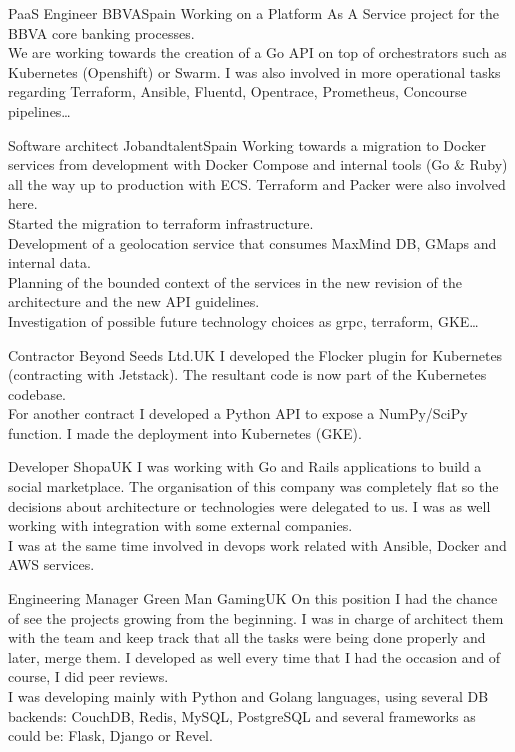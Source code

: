 \documentclass[11pt, a4paper, sans]{moderncv}
\begin{document}
\makecvtitle


%
%

{PaaS Engineer}
{BBVA}{Spain}{}
{Working on a Platform As A Service project for the BBVA core banking processes.\\
We are working towards the creation of a Go API on top of orchestrators such as Kubernetes (Openshift) or Swarm. I was also involved in more operational tasks regarding Terraform, Ansible, Fluentd, Opentrace, Prometheus, Concourse pipelines\ldots\\}

{Software architect}
{Jobandtalent}{Spain}{}
{Working towards a migration to Docker services from development with
  Docker Compose and internal tools (Go \& Ruby) all the way up to
  production with ECS. Terraform and Packer were also involved here.\\
  Started the migration to terraform infrastructure.\\
Development of a geolocation service that consumes MaxMind DB, GMaps and
internal data.\\
Planning of the bounded context of the services in the new revision of the
architecture and the new API guidelines.\\
Investigation of possible future technology choices as grpc, terraform, GKE\ldots\\}

{Contractor}
{Beyond Seeds Ltd.}{UK}{}
{I developed the Flocker plugin for Kubernetes (contracting with Jetstack). The resultant code is now part of the Kubernetes codebase.\\
For another contract I developed a Python API to expose a NumPy/SciPy function. I made the deployment into Kubernetes (GKE).\\}

{Developer}
{Shopa}{UK}{}
{I was working with Go and Rails applications to build a social marketplace. The
organisation of this company was completely flat so the decisions about
architecture or technologies were delegated to us. I was as well working with
integration with some external companies.\\I was at the same time involved in
devops work related with Ansible, Docker and AWS services.\\}

{Engineering Manager}
{Green Man Gaming}{UK}{}
{On this position I had the chance of see the projects growing from the
beginning. I was in charge of architect them with the team and keep track that
all the tasks were being done properly and later, merge them. I developed  as
well every time that I had the occasion and of course, I did peer reviews.\\I
was developing mainly with Python and Golang languages, using several DB
backends: CouchDB, Redis, MySQL, PostgreSQL and several frameworks as could be:
Flask, Django or Revel.\\}
\end{document}
